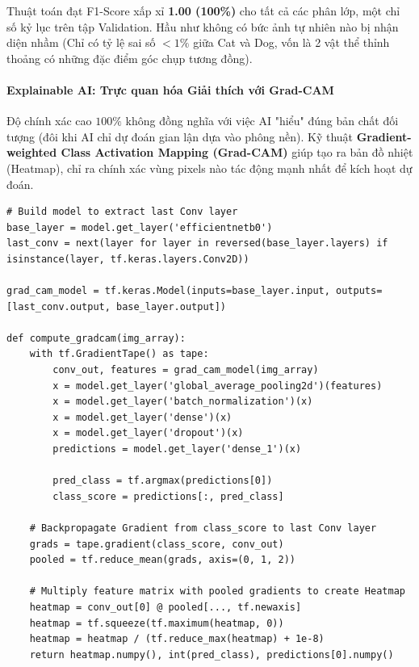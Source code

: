 Thuật toán đạt F1-Score xấp xỉ \textbf{1.00 (100\%)} cho tất cả các phân lớp, một chỉ số kỷ lục trên tập Validation. Hầu như không có bức ảnh tự nhiên nào bị nhận diện nhầm (Chỉ có tỷ lệ sai số $< 1\%$ giữa Cat và Dog, vốn là 2 vật thể thỉnh thoảng có những đặc điểm góc chụp tương đồng).

\paragraph{Explainable AI: Trực quan hóa Giải thích với Grad-CAM} \hfill\mbox{}

Độ chính xác cao $100\%$ không đồng nghĩa với việc AI "hiểu" đúng bản chất đối tượng (đôi khi AI chỉ dự đoán gian lận dựa vào phông nền). Kỹ thuật \textbf{Gradient-weighted Class Activation Mapping (Grad-CAM)} giúp tạo ra bản đồ nhiệt (Heatmap), chỉ ra chính xác vùng pixels nào tác động mạnh nhất để kích hoạt dự đoán.

\begin{lstlisting}[style=pythoncode, caption={Hàm Grad-CAM trích xuất Gradient từ lớp Convolution cuối cùng}]
# Build model to extract last Conv layer
base_layer = model.get_layer('efficientnetb0')
last_conv = next(layer for layer in reversed(base_layer.layers) if isinstance(layer, tf.keras.layers.Conv2D))

grad_cam_model = tf.keras.Model(inputs=base_layer.input, outputs=[last_conv.output, base_layer.output])

def compute_gradcam(img_array):
    with tf.GradientTape() as tape:
        conv_out, features = grad_cam_model(img_array)
        x = model.get_layer('global_average_pooling2d')(features)
        x = model.get_layer('batch_normalization')(x)
        x = model.get_layer('dense')(x)
        x = model.get_layer('dropout')(x)
        predictions = model.get_layer('dense_1')(x)
        
        pred_class = tf.argmax(predictions[0])
        class_score = predictions[:, pred_class]

    # Backpropagate Gradient from class_score to last Conv layer
    grads = tape.gradient(class_score, conv_out)
    pooled = tf.reduce_mean(grads, axis=(0, 1, 2))
    
    # Multiply feature matrix with pooled gradients to create Heatmap
    heatmap = conv_out[0] @ pooled[..., tf.newaxis]
    heatmap = tf.squeeze(tf.maximum(heatmap, 0))
    heatmap = heatmap / (tf.reduce_max(heatmap) + 1e-8)
    return heatmap.numpy(), int(pred_class), predictions[0].numpy()
\end{lstlisting}

